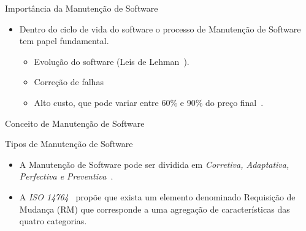 \documentclass[t,14pt,mathserif]{beamer}
\begin{document}
\begin{frame}{Importância da Manutenção de Software}
	\begin{itemize}
        \item Dentro do ciclo de vida do software o processo de Manutenção de
            Software tem papel fundamental.
            \begin{itemize}
                \item Evolução do software (Leis de
                      Lehman~\cite{lehman1980understanding}).
                \item Correção de falhas
                \item Alto custo, que pode variar entre 60\% e 90\% do preço
                      final~\cite{kaur2015review}.
            \end{itemize}
	\end{itemize}
\end{frame}

\begin{frame}{Conceito de Manutenção de Software}
\end{frame}

\begin{frame}{Tipos de Manutenção de Software}
	\begin{itemize}

        \item A Manutenção de Software pode ser dividida em \textit{Corretiva,
              Adaptativa, Perfectiva e
              Preventiva}~\cite{Lientz:1980:SMM:601062,159342}.

        \item A \textit{ISO 14764}~\cite{1703974} propõe que exista um elemento
              denominado \alert{Requisição de Mudança (RM)} que corresponde a
              uma agregação de características das quatro categorias.

	\end{itemize}
\end{frame}
\end{document}
